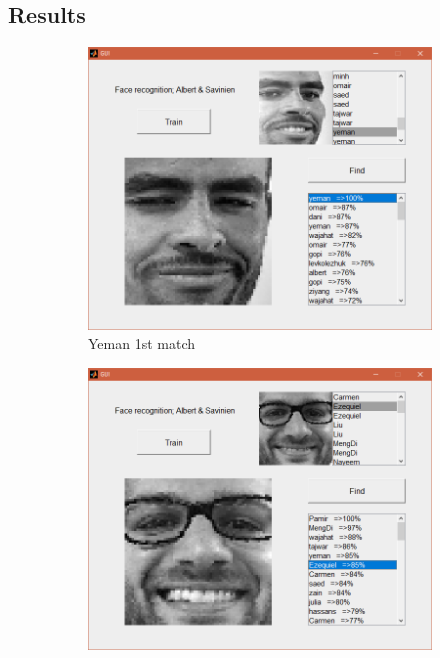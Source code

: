 \documentclass[12pt,a4paper,titlepage]{article}
\begin{document}
 \subsection{Results}
\begin{figure}[H]
	\centering
	\begin{subfigure}{0.48\columnwidth}
		\centering
		\includegraphics[width=\textwidth]{gui1}
		\caption{Yeman 1st match}
	\end{subfigure}
	\quad
	\begin{subfigure}{0.48\textwidth}
		\centering
		\includegraphics[width=\textwidth]{gui2}

\end{subfigure}
\end{figure}
\end{document}
